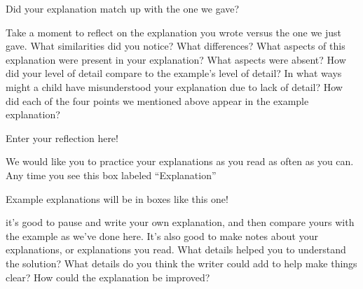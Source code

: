 \documentclass[noauthor,nooutcomes]{ximera}
\begin{document}
\begin{problem}
\begin{problem}
\begin{prompt}
	Did your explanation match up with the one we gave?
	\begin{multipleChoice}
	\end{multipleChoice}
\end{prompt}
\end{problem}
\end{problem}

Take a moment to reflect on the explanation you wrote versus the one we just gave. What similarities did you notice? What differences? What aspects of this explanation were present in your explanation? What aspects were absent? How did your level of detail compare to the example's level of detail? In what ways might a child have misunderstood your explanation due to lack of detail? How did each of the four points we mentioned above appear in the example explanation?
\begin{freeResponse}
	Enter your reflection here!
\end{freeResponse}


We would like you to practice your explanations as you read as often as you can. Any time you see this box labeled ``Explanation''
\begin{explanation}
	Example explanations will be in boxes like this one!
\end{explanation}
it's good to pause and write your own explanation, and then compare yours with the example as we've done here. It's also good to make notes about your explanations, or explanations you read. What details helped you to understand the solution? What details do you think the writer could add to help make things clear? How could the explanation be improved?
\end{document}
